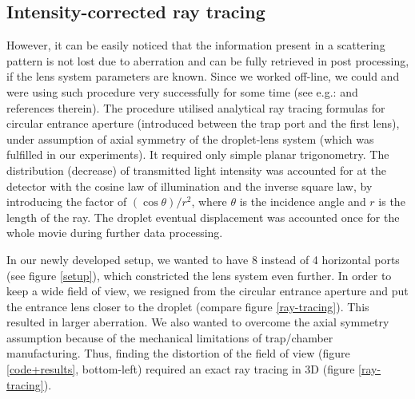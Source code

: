 \documentclass[preprint,review,12pt,dvips]{elsarticle}
\begin{document}
\subsection{Intensity-corrected ray tracing} However, it can be easily noticed that the information present in a scattering
pattern is not lost due to aberration and can be fully retrieved in post processing, if the lens system parameters are
known. Since we worked off-line, we could and were using such procedure very successfully for some time (see e.g.:
\cite{RoP,liquids,HK-soft_matter,Hi-precission} and references therein). The procedure utilised analytical ray tracing
formulas for circular entrance aperture (introduced between the trap port and the first lens), under assumption of axial
symmetry of the droplet-lens system (which was fulfilled in our experiments). It required only simple planar trigonometry.
The distribution (decrease) of transmitted light intensity was accounted for at the detector with the cosine law of
illumination and the inverse square law, by introducing the factor of $(\cos \theta) /r^2$, where $\theta$ is the
incidence angle and $r$ is the length of the ray. The droplet eventual displacement was accounted once for the whole movie
during further data processing.

In our newly developed setup, we wanted to have 8 instead of 4 horizontal ports (see figure \ref{setup}), which
constricted the lens system even further. In order to keep a wide field of view, we resigned from the circular entrance
aperture and put the entrance lens closer to the droplet (compare figure \ref{ray-tracing}). This resulted in larger
aberration. We also wanted to overcome the axial symmetry assumption because of the mechanical limitations of trap/chamber
manufacturing. Thus, finding the distortion of the field of view (figure \ref{code+results}, bottom-left) required an
exact ray tracing in 3D (figure \ref{ray-tracing}).
\end{document}
